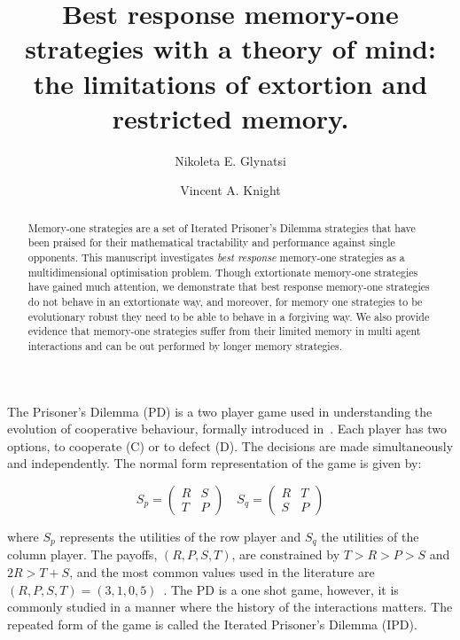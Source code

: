 \documentclass[10pt]{article}
\title{Best response memory-one strategies with a theory of mind: the limitations
of extortion and restricted memory.}
\author[1, *]{Nikoleta E. Glynatsi}
\author[1]{Vincent A. Knight}
\affil[1]{Cardiff University, School of Mathematics, Cardiff, United Kingdom}
\affil[*]{Corresponding author: Nikoleta E. Glynatsi, glynatsine@cardiff.ac.uk}
\date{}
\begin{document}
\maketitle

\newpage

\begin{abstract}
    Memory-one strategies are a set of Iterated Prisoner's Dilemma strategies
    that have been praised for their mathematical tractability and performance
    against single opponents. This manuscript investigates \textit{best
    response} memory-one strategies as a multidimensional
    optimisation problem. Though extortionate memory-one strategies have gained
    much attention, we demonstrate that best response memory-one strategies do not
    behave in an extortionate way, and moreover, for memory one strategies to be
    evolutionary robust they need to be able to behave in a forgiving way. We
    also provide evidence that memory-one strategies suffer from their limited
    memory in multi agent interactions and can be out performed by
    longer memory strategies.
\end{abstract}

The Prisoner's Dilemma (PD) is a two player game used in understanding the
evolution of cooperative behaviour, formally introduced in~\cite{Flood1958}.
Each player has two options, to cooperate (C) or to defect (D). The decisions
are made simultaneously and independently. The normal form representation of the
game is given by:

\begin{equation}\label{equ:pd_definition}
    S_p =
    \begin{pmatrix}
        R & S  \\
        T & P
    \end{pmatrix}
    \quad
    S_q =
    \begin{pmatrix}
        R & T  \\
        S & P
    \end{pmatrix}
\end{equation}

where \(S_p\) represents the utilities of the row player and \(S_q\) the
utilities of the column player. The payoffs, \((R, P, S, T)\), are constrained
by \(T > R > P > S\) and \(2R > T + S\), and the most common values used in the
literature are \((R, P, S, T) = (3, 1, 0, 5)\)~\cite{Axelrod1981}.
The PD is a one shot game, however, it is commonly studied in a manner where the
history of the interactions matters. The repeated form of the game is called the
Iterated Prisoner's Dilemma (IPD).
\end{document}
